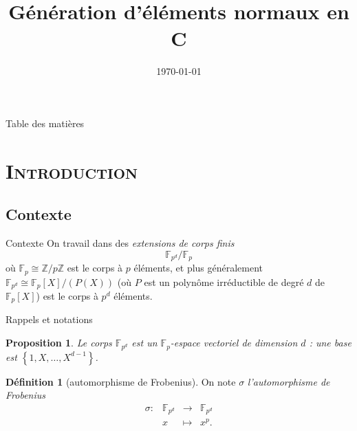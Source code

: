 \documentclass[xcolor=x11names,compress]{beamer}
\theoremstyle{break}
\newtheorem{prop}[thm]{Proposition}
\theoremstyle{sc}
\theoremstyle{definition}
\newtheorem{defi}[thm]{Définition}
\theoremstyle{remark}
\begin{document}
\begin{frame}
\title{Génération d'éléments normaux en C}
\date{\today}
\titlepage
\end{frame}

\begin{frame}{Table des matières}
\tableofcontents
\end{frame}

\section{\scshape Introduction}
\subsection{Contexte}
\begin{frame}{Contexte}
  On travail dans des \emph{extensions de corps finis} 
  \[
    \mathbb{F}_{p^d}/\mathbb{F}_p
  \]
  où $\mathbb{F}_p\cong \mathbb{Z}/p\mathbb{Z}$ est le corps à $p$ éléments, et
  plus généralement $\mathbb{F}_{p^d}\cong\mathbb{F}_p[X]/(P(X))$ (où $P$ est un
  polynôme irréductible de degré $d$ de $\mathbb{F}_p[X]$) est le corps à $p^d$ éléments.
\end{frame}

\begin{frame}{Rappels et notations}
  \begin{prop}
  Le corps $\mathbb{F}_{p^d}$ est un $\mathbb{F}_p$-espace vectoriel de
  dimension $d$ : une base est $\left\{ 1, X, \dots, X^{d-1} \right\}$.
  \end{prop}
  \begin{defi}[automorphisme de Frobenius]
    On note $\sigma$ \emph{l'automorphisme de Frobenius}
    \[
      \begin{array}{cccc}
        \sigma: & \mathbb{F}_{p^d} & \to & \mathbb{F}_{p^d} \\
        & x & \mapsto & x^p.
      \end{array}
    \]
  \end{defi}
\end{frame}
\end{document}
